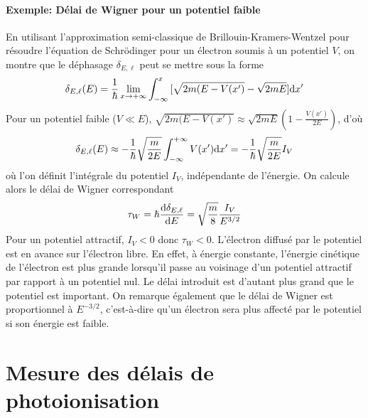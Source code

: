 \paragraph{Exemple: Délai de Wigner pour un potentiel faible}
En utilisant l'approximation semi-classique de Brillouin-Kramers-Wentzel pour résoudre l'équation de Schrödinger pour un électron soumis à un potentiel $V$, on montre que le déphasage $\delta_{E,\ell}$ peut se mettre sous la forme  
\begin{equation}
\delta_{E,\ell} (E) = \frac{1}{\hbar} \lim_{x \to + \infty} \int_{- \infty}^{x} { [\sqrt{2m(E-V(x')}-\sqrt{2mE}] \mathrm{d} x'}
\end{equation}
Pour un potentiel faible ($V \ll E $), $\sqrt{2m(E-V(x')} \approx \sqrt{2mE}(1-\frac{V(x')}{2E})$, d'où
\begin{equation}
\delta_{E,\ell} (E) \approx - \frac{1}{\hbar} \sqrt{\frac{m}{2E}} \int_{- \infty}^{+ \infty} { V(x')\mathrm{d} x'} = - \frac{1}{\hbar} \sqrt{\frac{m}{2E}} I_V
\end{equation}
où l'on définit l'intégrale du potentiel $I_V$, indépendante de l'énergie.
On calcule alors le délai de Wigner correspondant
\begin{equation}
\tau_W = \hbar \frac{\mathrm{d} \delta_{E,\ell}}{\mathrm{d} E} = \sqrt{\frac{m}{8}} \frac{I_V}{E^{3/2}}
\end{equation}
Pour un potentiel attractif, $I_V < 0$ donc $\tau_W < 0$. L'électron diffusé par le potentiel est en avance sur l'électron libre. En effet, à énergie constante, l'énergie cinétique de l'électron est plus grande lorsqu'il passe au voisinage d'un potentiel attractif par rapport à un potentiel nul. Le délai introduit est d'autant plus grand que le potentiel est important.
On remarque également que le délai de Wigner est proportionnel à $E^{-3/2}$, c'est-à-dire qu'un électron sera plus affecté par le potentiel si son énergie est faible.


\section{Mesure des délais de photoionisation}
